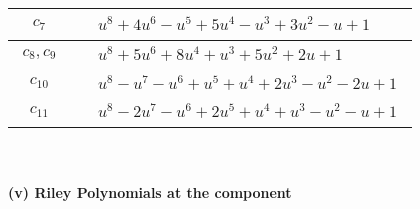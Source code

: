 \documentclass[1p]{elsarticle_modified}
\theoremstyle{definition}
\begin{document}
\begin{tabular}{m{50pt}|m{274pt}}
\hline $$\begin{aligned}c_{7}\end{aligned}$$&$\begin{aligned}
&u^8+4 u^6- u^5+5 u^4- u^3+3 u^2- u+1
\end{aligned}$\\
\hline $$\begin{aligned}c_{8},c_{9}\end{aligned}$$&$\begin{aligned}
&u^8+5 u^6+8 u^4+u^3+5 u^2+2 u+1
\end{aligned}$\\
\hline $$\begin{aligned}c_{10}\end{aligned}$$&$\begin{aligned}
&u^8- u^7- u^6+u^5+u^4+2 u^3- u^2-2 u+1
\end{aligned}$\\
\hline $$\begin{aligned}c_{11}\end{aligned}$$&$\begin{aligned}
&u^8-2 u^7- u^6+2 u^5+u^4+u^3- u^2- u+1
\end{aligned}$\\
\hline
\end{tabular}\\~\\
\newpage\renewcommand{\arraystretch}{1}
\flushleft \textbf{(v) Riley Polynomials at the component}\newline \\
\end{document}
